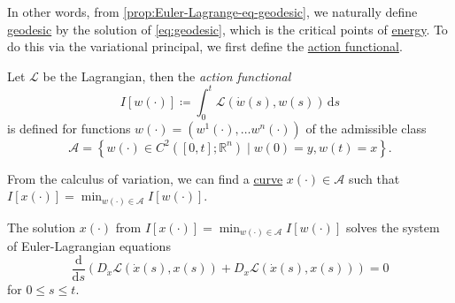 In other words, from \autoref{prop:Euler-Lagrange-eq-geodesic}, we naturally define \hyperref[def:geodesic]{geodesic} by the solution of \autoref{eq:geodesic}, which is the critical points of \hyperref[def:energy]{energy}. To do this via the variational principal, we first define the \hyperref[def:action-functional]{action functional}.

\begin{definition}\label{def:action-functional}
	Let \(\mathcal{L} \) be the Lagrangian, then the \emph{action functional}
	\[
		I[w(\cdot)] \coloneqq \int_{0}^{t} \mathcal{L} (\dot{w}(s), w(s)) \,\mathrm{d}s
	\]
	is defined for functions \(w(\cdot) = (w^1(\cdot), \ldots w^n(\cdot))\) of the admissible class
	\[
		\mathcal{A} =\left\{ w(\cdot)\in C^2([0, t]; \mathbb{R} ^n) \mid w(0)= y, w(t)= x\right\}.
	\]
\end{definition}

From the calculus of variation, we can find a \hyperref[def:curve]{curve} \(x(\cdot)\in \mathcal{A} \) such that \(I[x(\cdot)] = \min _{w(\cdot)\in \mathcal{A} }I[w(\cdot)]\).

\begin{theorem}\label{thm:Euler-Lagrangian-eq}
	The solution \(x(\cdot)\) from \(I[x(\cdot)] = \min _{w(\cdot)\in \mathcal{A} }I[w(\cdot)]\) solves the system of Euler-Lagrangian equations
	\[
		\frac{\mathrm{d}}{\mathrm{d}s} \left( D_{\dot{x}} \mathcal{L} (\dot{x}(s), x(s)) + D_x \mathcal{L} (\dot{x}(s), x(s)) \right) = 0
	\]
	for \(0 \leq s \leq t\).
\end{theorem}